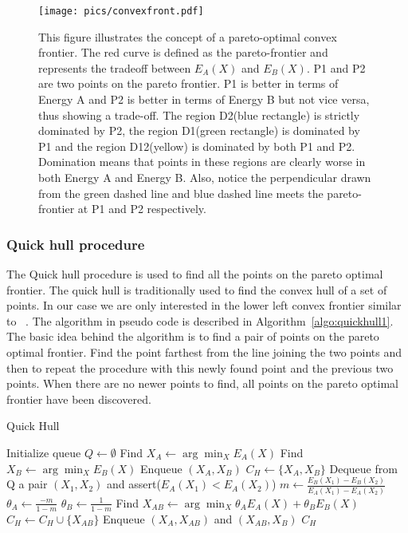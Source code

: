 \documentclass{article}
\begin{document}
\begin{figure}[h!]
    \centering
    \texttt{[image: pics/convexfront.pdf]}
    \caption{This figure illustrates the concept of a pareto-optimal convex frontier. The red curve is defined as the pareto-frontier and represents the tradeoff between $E_A(X)$ and $E_B(X)$. P1 and P2 are two points on the pareto frontier. P1 is better in terms of Energy A and P2 is better in terms of Energy B but not vice versa, thus showing a trade-off. The region D2(blue rectangle) is strictly dominated by P2, the region D1(green rectangle) is dominated by P1 and the region D12(yellow) is dominated by both P1 and P2. Domination means that points in these regions are clearly worse in both Energy A and Energy B. Also, notice the perpendicular drawn from the green dashed line and blue dashed line meets the pareto-frontier at P1 and P2 respectively.}
    \label{fig:cvxfront}
\end{figure}

\pagebreak

\subsubsection*{Quick hull procedure}
The Quick hull procedure is used to find all the points on the pareto optimal frontier. The quick hull is traditionally used to find the convex hull of a set of points. In our case we are only interested in the lower left convex frontier similar to ~\cite{Zheng2009}.  The algorithm in pseudo code is described in Algorithm~\ref{algo:quickhull1}. The basic idea behind the algorithm is to find a pair of points on the pareto optimal frontier. Find the point farthest from the line joining the two points and then to repeat the procedure with this newly found point and the previous two points. When there are no newer points to find, all points on the pareto optimal frontier have been discovered. 

\begin{algorithm}
\caption{Quick Hull} \label{algo:quickhull1}
\begin{algorithmic}
\State Initialize queue $Q \gets \emptyset$
\State Find $X_A \gets \arg \min_X E_A(X) $
\State Find $X_B \gets \arg \min_X E_B(X) $
\State Enqueue $(X_A,X_B)$
\State $C_H \gets \{X_A,X_B\}$
\Repeat
	\State Dequeue from Q a pair $(X_1,X_2)$ and assert($E_A(X_1) < E_A(X_2)$)
	\State $m \gets \frac{E_B(X_1)-E_B(X_2)}{E_A(X_1)-E_A(X_2)}$
	\State $\theta_A \gets \frac{-m}{1-m}$
	\State $\theta_B \gets \frac{1}{1-m}$
	\State Find $X_{AB} \gets \arg \min_X \theta_A E_A(X) + \theta_B E_B(X) $
		\State $C_H \gets C_H \cup \{X_{AB}\}$
		\State Enqueue $(X_A,X_{AB})$ and $(X_{AB},X_B)$
	\EndIf
{}
\State \Return $C_H$
\end{algorithmic}
\end{algorithm}
\end{document}
